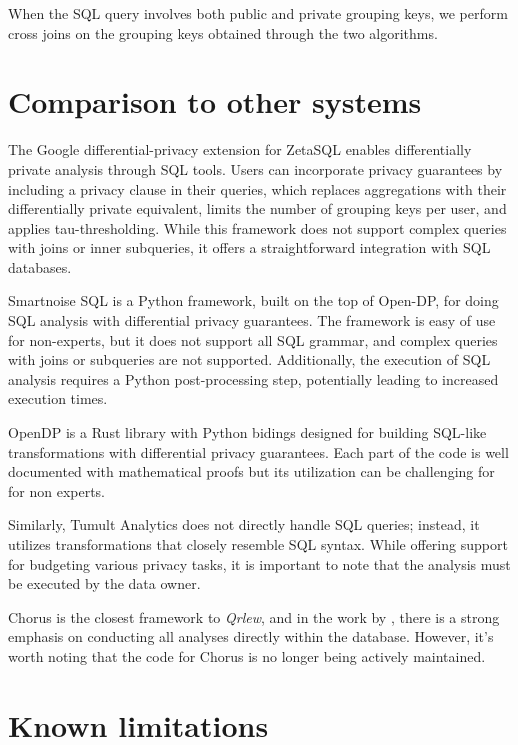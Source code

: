 \documentclass[letterpaper]{article} %
\newcommand{\qrlew}{\emph{Qrlew}}
\begin{document}
When the SQL query involves both public and private grouping keys, we perform cross joins on the grouping keys obtained through the two algorithms.

\section{Comparison to other systems}

The Google differential-privacy extension for ZetaSQL enables differentially private analysis through SQL tools.
Users can incorporate privacy guarantees by including a privacy clause in their queries, which replaces aggregations with their differentially private equivalent,
limits the number of grouping keys per user, and applies tau-thresholding.
While this framework does not support complex queries with joins or inner subqueries,
it offers a straightforward integration with SQL databases.

Smartnoise SQL is a Python framework, built on the top of Open-DP, for doing SQL analysis with differential privacy guarantees.
The framework is easy of use for non-experts, but it does not support all SQL grammar, and complex queries with joins or subqueries are not supported.
Additionally, the execution of SQL analysis requires a Python post-processing step,
potentially leading to increased execution times.

OpenDP is a Rust library with Python bidings designed for building SQL-like transformations with differential privacy guarantees.
Each part of the code is well documented with mathematical proofs but
its utilization can be challenging for for non experts.

Similarly, Tumult Analytics does not directly handle SQL queries; instead, it utilizes transformations that closely resemble SQL syntax.
While offering support for budgeting various privacy tasks, it is important to note that the analysis must be executed by the data owner.

Chorus is the closest framework to \qrlew, and in the work by \citeauthor{johnson2020chorus},
there is a strong emphasis on conducting all analyses directly within the database.
However, it's worth noting that the code for Chorus is no longer being actively maintained.



\section{Known limitations}
\end{document}
